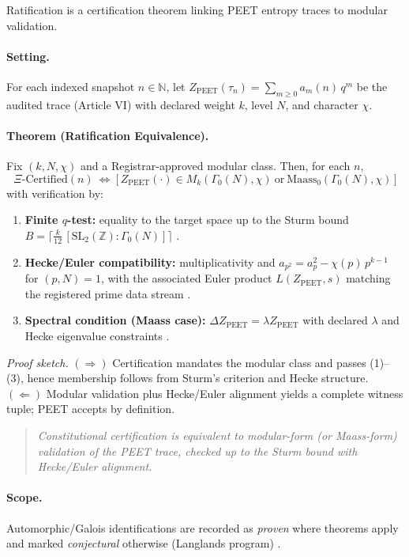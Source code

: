 \documentclass[12pt]{amsart}
\theoremstyle{plain}
\begin{document}
Ratification is a certification theorem linking PEET entropy traces to modular validation.

\paragraph{Setting.}
For each indexed snapshot $n\in\mathbb{N}$, let $Z_{\mathrm{PEET}}(\tau_n)=\sum_{m\ge0}a_m(n)\,q^m$ be the audited trace (Article VI) with declared weight $k$, level $N$, and character $\chi$.

\paragraph{Theorem (Ratification Equivalence).}
Fix $(k,N,\chi)$ and a Registrar-approved modular class. Then, for each $n$,
\[
\Xi\text{-Certified}(n)
\ \Longleftrightarrow\
\Big[\,Z_{\mathrm{PEET}}(\cdot)\in M_k(\Gamma_0(N),\chi)\ \text{or}\ \text{Maass}_0(\Gamma_0(N),\chi)\,\Big]
\]
with verification by:
\begin{enumerate}
  \item \textbf{Finite $q$-test:} equality to the target space up to the Sturm bound
  \(
  B=\big\lceil \tfrac{k}{12}\,[\mathrm{SL}_2(\mathbb{Z}):\Gamma_0(N)]\big\rceil
  \)
  \cite{sturm1987congruence,diamond2005first}.
  \item \textbf{Hecke/Euler compatibility:} multiplicativity and $a_{p^2}=a_p^2-\chi(p)\,p^{k-1}$ for $(p,N)=1$, with the associated Euler product $L(Z_{\mathrm{PEET}},s)$ matching the registered prime data stream \cite{diamond2005first,serre1973course,godement1972zeta}.
  \item \textbf{Spectral condition (Maass case):} $\Delta Z_{\mathrm{PEET}}=\lambda Z_{\mathrm{PEET}}$ with declared $\lambda$ and Hecke eigenvalue constraints \cite{iwaniec2002spectral}.
\end{enumerate}
\emph{Proof sketch.} $(\Rightarrow)$ Certification mandates the modular class and passes (1)–(3), hence membership follows from Sturm’s criterion and Hecke structure. $(\Leftarrow)$ Modular validation plus Hecke/Euler alignment yields a complete witness tuple; PEET accepts by definition.

\begin{quote}
\textit{Constitutional certification is equivalent to modular-form (or Maass-form) validation of the PEET trace, checked up to the Sturm bound with Hecke/Euler alignment.}
\end{quote}

\paragraph{Scope.}
Automorphic/Galois identifications are recorded as \emph{proven} where theorems apply and marked \emph{conjectural} otherwise (Langlands program) \cite{langlands1970problems,harris2001geometry}.
\end{document}
